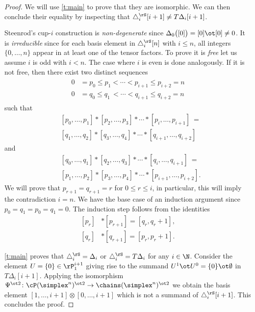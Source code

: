\begin{proof}
	We will use \cref{t:main} to prove that they are isomorphic.
	We can then conclude their equality by inspecting that $\triangle^\rS_i [i+1] \neq T \Delta_i [i+1]$.

	Steenrod's \mbox{cup-$i$} construction is \emph{non-degenerate} since $\Delta_0\big([0]\big) = [0] \ot [0] \neq 0$.
	It is \emph{irreducible} since for each basis element in $\triangle^\rS_i [n]$ with $i \leq n$, all integers $\{0, \dots, n\}$ appear in at least one of the tensor factors.
	To prove it is \emph{free} let us assume $i$ is odd with $i < n$.
	The case where $i$ is even is done analogously.
	If it is not free, then there exist two distinct sequences
	\begin{align*}
	\begin{split}
	0 &= p_0 \leq p_1 < \cdots < p_{i+1} \leq p_{i+2} = n \\
	0 &= q_0 \leq q_1 \,< \cdots < q_{i+1} \leq q_{i+2} = n
	\end{split}
	\end{align*}
	such that
	\[
	\begin{split}
	&[ {p_0}, \dots, {p_1} ] \ast [ {p_2}, \dots, {p_3} ] \ast \cdots \ast [ {p_{i}}, \dots, {p_{i+1}} ]\ = \\
	&[ {q_1}, \dots, {q_2} ] \ast [ {q_3}, \dots, {q_4} ] \ast \cdots \ast [ {q_{i+1}}, \dots, {q_{i+2}} ]
	\end{split}
	\]
	and
	\[
	\begin{split}
	&[ {q_0}, \dots, {q_1} ] \ast [ {q_2}, \dots, {q_3} ] \ast \cdots \ast [ {q_{i}}, \dots, {q_{i+1}} ]\ = \\
	&[ {p_1}, \dots, {p_2} ] \ast [ {p_3}, \dots, {p_4} ] \ast \cdots \ast [ {p_{i+1}}, \dots, {p_{i+2}} ].
	\end{split}
	\]
	We will prove that $p_{r+1} = q_{r+1} = r$ for $0 \leq r \leq i$, in particular, this will imply the contradiction $i = n$.
	We have the base case of an induction argument since $p_0 = q_1 = p_0 = q_1 = 0$.
	The induction step follows from the identities
	\[
	\begin{split}
	[p_r] &\ast [p_{r+1}] = [q_r, q_{r}+1], \\
	[q_r] &\ast [q_{r+1}] = [p_r, p_{r}+1].
	\end{split}
	\]

	\cref{t:main} proves that $\triangle^\rS_i = \Delta_i$ or $\triangle^\rS_i = T \Delta_i$ for any $i \in \N$.
	Consider the element $U = \{0\} \in \rP_{1}^{i+1}$ giving rise to the summand $U^1 \ot U^0 = \{0\} \ot \emptyset$ in $T \Delta_i [i+1]$.
	Applying the isomorphism $\Psi^{\ot 2} \colon \cP(\simplex^n)^{\ot 2} \to \chains(\simplex^n)^{\ot 2}$ we obtain the basis element $[1,\dots,i+1] \otimes [0,\dots,i+1]$ which is not a summand of $\triangle^\rS_i [i+1]$.
	This concludes the proof.
\end{proof}

